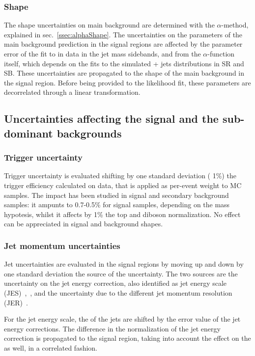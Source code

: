 \subsubsection{Shape}

The shape uncertainties on main background are determined with the $\alpha$-method, explained in sec.~\ref{ssec:alphaShape}. The uncertainties on the parameters of the main background prediction in the signal regions are affected by the parameter error of the fit to \mtVZ in data in the jet mass sidebands, and from the $\alpha$-function itself, which depends on the \mtVZ fits to the simulated \V + jets distributions in SR and SB. These uncertainties are propagated to the shape of the main background in the signal region. Before being provided to the likelihood fit, these parameters are decorrelated through a linear transformation.

\subsection{Uncertainties affecting the signal and the sub-dominant backgrounds}

\subsubsection{Trigger uncertainty}

Trigger uncertainty is evaluated shifting by one standard deviation ( 1\%) the \MET trigger efficiency calculated on data, that is applied as per-event weight to MC samples. The impact has been studied in signal and secondary background samples: it ampunts to 0.7-0.5\% for signal samples, depending on the mass hypotesis, whilst it affects by 1\% the top and diboson normalization. No effect can be appreciated in signal and background shapes.

\subsubsection{Jet momentum uncertainties}

Jet uncertainties are evaluated in the signal regions by moving up and down by one standard deviation the source of the uncertainty. The two sources are the uncertainty on the jet energy correction, also identified as jet energy scale (JES)~\cite{bib:1748-0221-6-11-P11002},~\cite{CMS-DP-2016-020}, and the uncertainty due to the different jet momentum resolution (JER)~\cite{CMS-DP-2016-020}.

\noindent For the jet energy scale, the \pt of the jets are shifted by the error value of the jet energy corrections. The difference in the normalization of the jet energy correction is propagated to the signal region, taking into account the effect on the \MET as well, in a correlated fashion.

